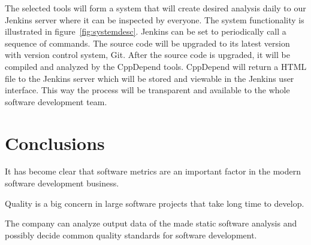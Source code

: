The selected tools will form a system that will create desired analysis daily to our Jenkins server where it can be inspected by everyone. The system functionality is illustrated in figure~\ref{fig:systemdesc}. Jenkins can be set to periodically call a sequence of commands. The source code will be upgraded to its latest version with version control system, Git. After the source code is upgraded, it will be compiled and analyzed by the CppDepend tools. CppDepend will return a HTML file to the Jenkins server which will be stored and viewable in the Jenkins user interface.
This way the process will be transparent and available to the whole software development team.




\chapter{Conclusions}

It has become clear that software metrics are an important factor in the modern software development business.

Quality is a big concern in large software projects that take long time to develop.

The company can analyze output data of the made static software analysis and possibly decide common quality standards for software development.











